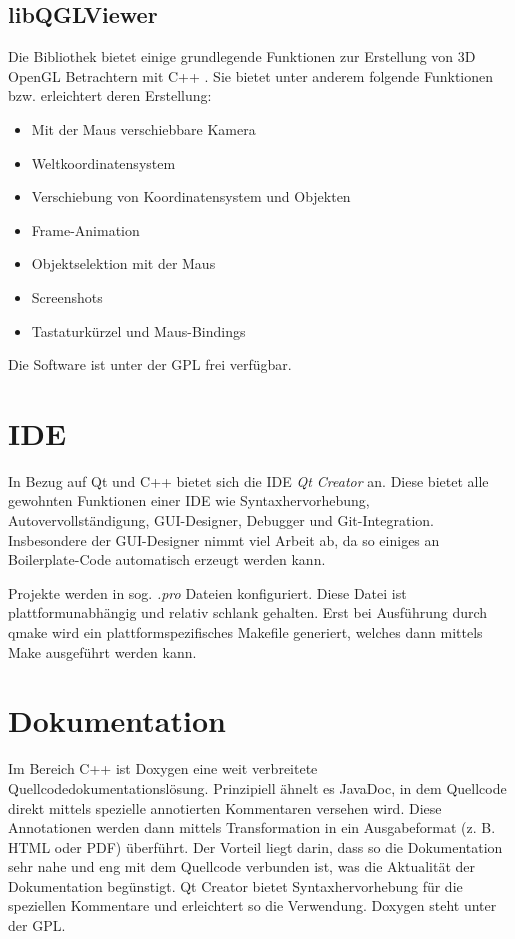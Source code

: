 \subsection{libQGLViewer} %

Die Bibliothek bietet einige grundlegende Funktionen zur Erstellung von 3D OpenGL Betrachtern mit C++ \cite{libQGLViewer}.
Sie bietet unter anderem folgende Funktionen bzw. erleichtert deren Erstellung:

\begin{itemize}
\item Mit der Maus verschiebbare Kamera
\item Weltkoordinatensystem
\item Verschiebung von Koordinatensystem und Objekten
\item Frame-Animation
\item Objektselektion mit der Maus
\item Screenshots
\item Tastaturkürzel und Maus-Bindings
\end{itemize}

Die Software ist unter der \ac{GPL} frei verfügbar.

\section{IDE} %

In Bezug auf Qt und C++ bietet sich die IDE \emph{Qt Creator} \cite{QtCreator} an. 
Diese bietet alle gewohnten Funktionen einer IDE wie Syntaxhervorhebung, Autovervollständigung, GUI-Designer, Debugger und Git-Integration.
Insbesondere der GUI-Designer nimmt viel Arbeit ab, da so einiges an Boilerplate-Code automatisch erzeugt werden kann.

Projekte werden in sog. \emph{.pro} Dateien konfiguriert. 
Diese Datei ist plattformunabhängig und relativ schlank gehalten. 
Erst bei Ausführung durch qmake wird ein plattformspezifisches Makefile generiert, welches dann mittels Make ausgeführt werden kann.

\section{Dokumentation} %

Im Bereich C++ ist Doxygen \cite{Doxygen} eine weit verbreitete Quellcodedokumentationslösung.
Prinzipiell ähnelt es JavaDoc, in dem Quellcode direkt mittels spezielle annotierten Kommentaren versehen wird.
Diese Annotationen werden dann mittels Transformation in ein Ausgabeformat (z. B. HTML oder PDF) überführt.
Der Vorteil liegt darin, dass so die Dokumentation sehr nahe und eng mit dem Quellcode verbunden ist, was die Aktualität der Dokumentation begünstigt.
Qt Creator bietet Syntaxhervorhebung für die speziellen Kommentare und erleichtert so die Verwendung.
Doxygen steht unter der \ac{GPL}.
